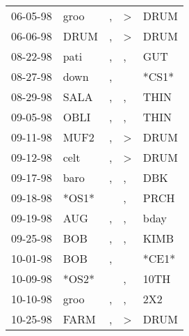 \begin{supertabular}{p{0.07\textwidth}p{0.06\textwidth}p{0.02\textwidth}p{0.02\textwidth}p{0.06\textwidth}}
 06-05-98\textsuperscript{} &           groo\textsuperscript{} &             , &  \textgreater &  DRUM\textsuperscript{} \\
 06-06-98\textsuperscript{} &           DRUM\textsuperscript{} &             , &  \textgreater &  DRUM\textsuperscript{} \\
 08-22-98\textsuperscript{} &           pati\textsuperscript{} &             , &             , &   GUT\textsuperscript{} \\
 08-27-98\textsuperscript{} &           down\textsuperscript{} &             , &               &                   *CS1* \\
 08-29-98\textsuperscript{} &           SALA\textsuperscript{} &             , &             , &  THIN\textsuperscript{} \\
 09-05-98\textsuperscript{} &           OBLI\textsuperscript{} &             , &             , &  THIN\textsuperscript{} \\
 09-11-98\textsuperscript{} &           MUF2\textsuperscript{} &             , &  \textgreater &  DRUM\textsuperscript{} \\
 09-12-98\textsuperscript{} &           celt\textsuperscript{} &             , &  \textgreater &  DRUM\textsuperscript{} \\
 09-17-98\textsuperscript{} &           baro\textsuperscript{} &             , &             , &   DBK\textsuperscript{} \\
 09-18-98\textsuperscript{} &                            *OS1* &               &             , &  PRCH\textsuperscript{} \\
 09-19-98\textsuperscript{} &            AUG\textsuperscript{} &             , &             , &  bday\textsuperscript{} \\
 09-25-98\textsuperscript{} &            BOB\textsuperscript{} &             , &             , &  KIMB\textsuperscript{} \\
 10-01-98\textsuperscript{} &            BOB\textsuperscript{} &             , &               &                   *CE1* \\
 10-09-98\textsuperscript{} &                            *OS2* &               &             , &  10TH\textsuperscript{} \\
 10-10-98\textsuperscript{} &           groo\textsuperscript{} &             , &             , &   2X2\textsuperscript{} \\
 10-25-98\textsuperscript{} &           FARM\textsuperscript{} &             , &  \textgreater &  DRUM\textsuperscript{} \\

\end{supertabular}
